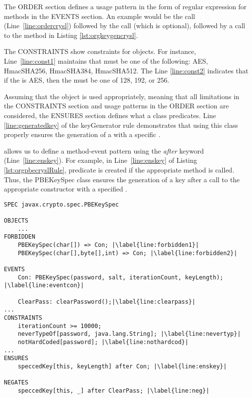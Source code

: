 The ORDER section defines a usage pattern in the form of regular expression for methods in the EVENTS section. An example would be the  call (Line~\ref{line:ordercrysl}) followed by the  call (which is optional), followed by a call to the  method in Listing \ref{lst:orgkeygencrysl}.

The CONSTRAINTS show constraints for objects. For instance, Line~\ref{line:const1} maintains that  must be one of the following: AES, HmacSHA256, HmacSHA384, HmacSHA512. The Line \ref{line:const2} indicates that if the  is AES, then the  must be one of 128, 192, or 256.
 
Assuming that the object is used appropriately, meaning that all limitations in the CONSTRAINTS section and usage patterns in the ORDER section are considered, the ENSURES section defines what a class predicates. Line \ref{line:generatedkey} of the keyGenerator \crysl rule demonstrates that using this class properly ensures the generation of a  with a specific .
  
\crysl{} allows us to define a method-event pattern using the \emph{after} keyword (Line~\ref{line:enskey}). For example, in Line~\ref{line:enskey} of Listing \ref{lst:orgpbecryslRule},  predicate is created if the appropriate method is called. Thus, the PBEKeySpec class ensures the generation of a key after a call to the appropriate constructor with a specified .

 

\begin{lstlisting}[language= CrySL,caption= Part of \crysl{} rule for javax.crypto.spec.PBEKeySpec from JCA ruleset \cite{apirules}., label={lst:orgpbecryslRule}, escapechar=|]
SPEC javax.crypto.spec.PBEKeySpec

OBJECTS
    ...
FORBIDDEN
	PBEKeySpec(char[]) => Con; |\label{line:forbidden1}|
	PBEKeySpec(char[],byte[],int) => Con; |\label{line:forbidden2}|
	
EVENTS
	Con: PBEKeySpec(password, salt, iterationCount, keyLength); |\label{line:eventcon}|
	
	ClearPass: clearPassword();|\label{line:clearpass}|
...
CONSTRAINTS
	iterationCount >= 10000;
	neverTypeOf[password, java.lang.String]; |\label{line:nevertyp}|
	notHardCoded[password]; |\label{line:nothardcod}|
...
ENSURES
	speccedKey[this, keyLength] after Con; |\label{line:enskey}|
	
NEGATES
	speccedKey[this, _] after ClearPass; |\label{line:neg}|
\end{lstlisting}


